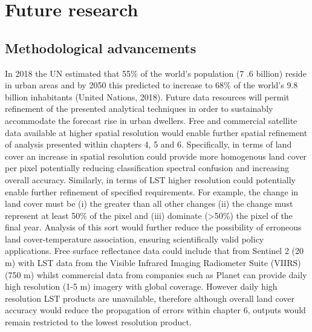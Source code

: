 \documentclass[]{book}
\begin{document}
\section{Future research}\label{future-research}

\subsection{Methodological
advancements}\label{methodological-advancements}

In 2018 the UN estimated that 55\% of the world's population (7 .6
billion) reside in urban areas and by 2050 this predicted to increase to
68\% of the world's 9.8 billion inhabitants (United Nations, 2018).
Future data resources will permit refinement of the presented analytical
techniques in order to sustainably accommodate the forecast rise in
urban dwellers. Free and commercial satellite data available at higher
spatial resolution would enable further spatial refinement of analysis
presented within chapters 4, 5 and 6. Specifically, in terms of land
cover an increase in spatial resolution could provide more homogenous
land cover per pixel potentially reducing classification spectral
confusion and increasing overall accuracy. Similarly, in terms of LST
higher resolution could potentially enable further refinement of
specified requirements. For example, the change in land cover must be
(i) the greater than all other changes (ii) the change must represent at
least 50\% of the pixel and (iii) dominate (\textgreater{}50\%) the
pixel of the final year. Analysis of this sort would further reduce the
possibility of erroneous land cover-temperature association, ensuring
scientifically valid policy applications. Free surface reflectance data
could include that from Sentinel 2 (20 m) with LST data from the Visible
Infrared Imaging Radiometer Suite (VIIRS) (750 m) whilst commercial data
from companies such as Planet can provide daily high resolution (1-5 m)
imagery with global coverage. However daily high resolution LST products
are unavailable, therefore although overall land cover accuracy would
reduce the propagation of errors within chapter 6, outputs would remain
restricted to the lowest resolution product.
\end{document}
